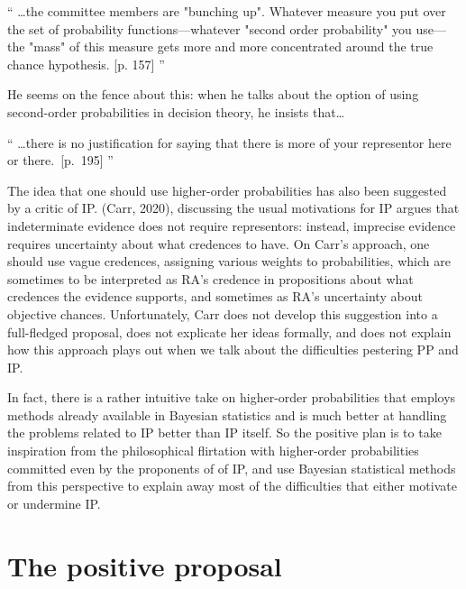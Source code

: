 \documentclass[
  10pt,
  dvipsnames,enabledeprecatedfontcommands]{scrartcl}
\renewenvironment{quote}
{\list{}{\leftmargin=1em\rightmargin=1em}\item[]``}
{''\endlist}
\begin{document}
\begin{quote}
\dots the committee members are "bunching up". Whatever measure you put over the set of probability functions---whatever "second order probability" you use---the "mass" of this measure gets more and more concentrated around the true chance hypothesis. [p. 157]
\end{quote}

\noindent He seems on the fence about this: when he talks about the
option of using second-order probabilities in decision theory, he
insists that\dots

\begin{quote} \dots there is no justification for saying that there is more of your representor here or there.~[p.~195]
\end{quote}

The idea that one should use higher-order probabilities has also been
suggested by a critic of IP. (Carr, 2020), discussing the usual
motivations for IP argues that indeterminate evidence does not require
representors: instead, imprecise evidence requires uncertainty about
what credences to have. On Carr's approach, one should use vague
credences, assigning various weights to probabilities, which are
sometimes to be interpreted as RA's credence in propositions about what
credences the evidence supports, and sometimes as RA's uncertainty about
objective chances. Unfortunately, Carr does not develop this suggestion
into a full-fledged proposal, does not explicate her ideas formally, and
does not explain how this approach plays out when we talk about the
difficulties pestering PP and IP.

In fact, there is a rather intuitive take on higher-order probabilities
that employs methods already available in Bayesian statistics and is
much better at handling the problems related to IP better than IP
itself. So the positive plan is to take inspiration from the
philosophical flirtation with higher-order probabilities committed even
by the proponents of of IP, and use Bayesian statistical methods from
this perspective to explain away most of the difficulties that either
motivate or undermine IP.

\hypertarget{the-positive-proposal}{%
\section{\texorpdfstring{The positive proposal
\label{sec:positive}}{The positive proposal }}\label{the-positive-proposal}}
\end{document}
